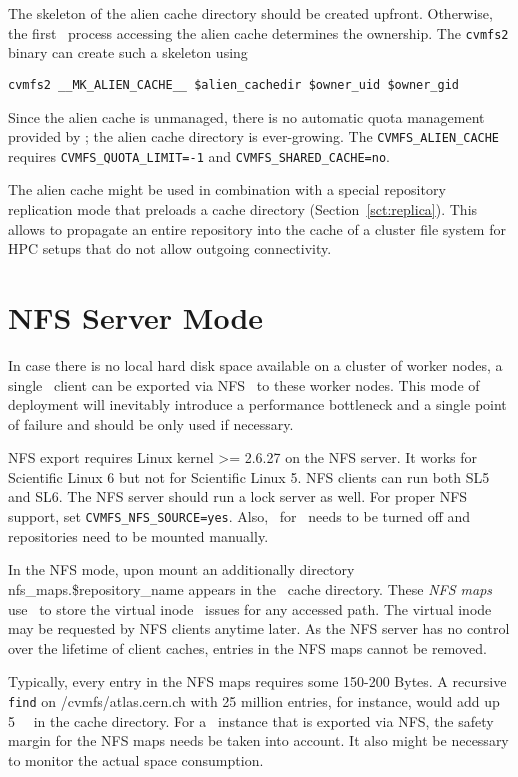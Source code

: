 The skeleton of the alien cache directory should be created upfront.
Otherwise, the first \cvmfs\ process accessing the alien cache determines the ownership.
The \texttt{cvmfs2} binary can create such a skeleton using
\begin{verbatim}
cvmfs2 __MK_ALIEN_CACHE__ $alien_cachedir $owner_uid $owner_gid
\end{verbatim}

Since the alien cache is unmanaged, there is no automatic quota management provided by \cvmfs; the alien cache directory is ever-growing.
The \texttt{CVMFS\_ALIEN\_CACHE} requires \texttt{CVMFS\_QUOTA\_LIMIT=-1} and \texttt{CVMFS\_SHARED\_CACHE=no}.

The alien cache might be used in combination with a special repository replication mode that preloads a cache directory (\cf Section~\ref{sct:replica}).
This allows to propagate an entire repository into the cache of a cluster file system for HPC setups that do not allow outgoing connectivity.

\section{NFS Server Mode}
In case there is no local hard disk space available on a cluster of worker nodes, a single \cvmfs\ client can be exported via NFS~\cite{rfc1813,rfc3530} to these worker nodes.
This mode of deployment will inevitably introduce a performance bottleneck and a single point of failure and should be only used if necessary.

NFS export requires Linux kernel >= 2.6.27 on the NFS server.
It works for Scientific Linux 6 but not for Scientific Linux 5.
NFS clients can run both SL5 and SL6.
The NFS server should run a lock server as well.
For proper NFS support, set \texttt{CVMFS\_NFS\_SOURCE=yes}. 
Also, \autofs\ for \cvmfs\ needs to be turned off and repositories need to be mounted manually.

In the NFS mode, upon mount an additionally directory nfs\_maps.\$repository\_name appears in the \cvmfs\ cache directory.
These \emph{NFS maps} use \leveldb\ to store the virtual inode \cvmfs\ issues for any accessed path.
The virtual inode may be requested by NFS clients anytime later.
As the NFS server has no control over the lifetime of client caches, entries in the NFS maps cannot be removed.

Typically, every entry in the NFS maps requires some 150-200 Bytes. 
A recursive \texttt{find} on /cvmfs/atlas.cern.ch with 25 million entries, for instance, would add up \SI{5}{\giga\byte} in the cache directory. 
For a \cvmfs\ instance that is exported via NFS, the safety margin for the NFS maps needs be taken into account.
It also might be necessary to monitor the actual space consumption.

